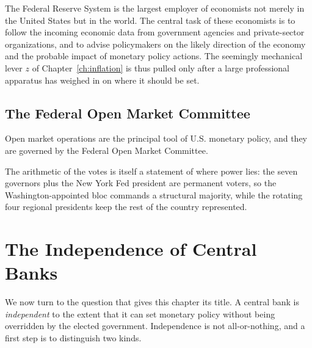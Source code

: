 The Federal Reserve System is the largest employer of economists not merely in the United States but in the world. The central task of these economists is to follow the incoming economic data from government agencies and private-sector organizations, and to advise policymakers on the likely direction of the economy and the probable impact of monetary policy actions. The seemingly mechanical lever $z$ of Chapter~\ref{ch:inflation} is thus pulled only after a large professional apparatus has weighed in on where it should be set.

\subsection{The Federal Open Market Committee}

Open market operations are the principal tool of U.S. monetary policy, and they are governed by the Federal Open Market Committee.


The arithmetic of the votes is itself a statement of where power lies: the seven governors plus the New York Fed president are permanent voters, so the Washington-appointed bloc commands a structural majority, while the rotating four regional presidents keep the rest of the country represented.

\section{The Independence of Central Banks}
\label{sec:independence}

We now turn to the question that gives this chapter its title. A central bank is \emph{independent} to the extent that it can set monetary policy without being overridden by the elected government. Independence is not all-or-nothing, and a first step is to distinguish two kinds.

